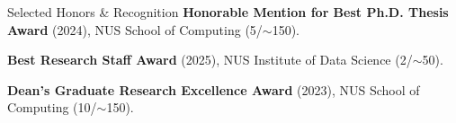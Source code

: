 \begin{rSection}{Selected Honors \& Recognition}
    \noindent \textbf{Honorable Mention for Best Ph.D. Thesis Award} (2024), NUS School of Computing (5/$\sim$150).\par
    \noindent \textbf{Best Research Staff Award} (2025), NUS Institute of Data Science (2/$\sim$50).\par
    \noindent \textbf{Dean's Graduate Research Excellence Award} (2023), NUS School of Computing (10/$\sim$150).\par
\end{rSection}
